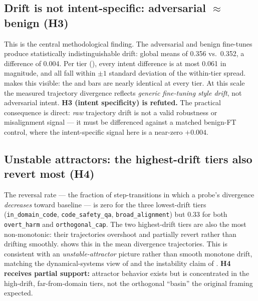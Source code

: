 \subsection{Drift is not intent-specific: adversarial $\approx$ benign (H3)}
\label{sec:results-h3}

This is the central methodological finding. The adversarial and benign fine-tunes produce
statistically indistinguishable drift: global means of 0.356 vs.\ 0.352, a difference of
0.004. Per tier (), every intent difference is at most 0.061 in
magnitude, and all fall within $\pm1$ standard deviation of the within-tier spread.
 makes this visible: the \insecure and \secure bars are nearly
identical at every tier. At this scale the measured trajectory divergence reflects
\emph{generic fine-tuning style drift}, not adversarial intent. {\bf H3 (intent specificity)
is refuted.} The practical consequence is direct: \emph{raw} trajectory drift is not a valid
robustness or misalignment signal --- it must be differenced against a matched benign-FT
control, where the intent-specific signal here is a near-zero $+0.004$.

\subsection{Unstable attractors: the highest-drift tiers also revert most (H4)}
\label{sec:results-h4}

The reversal rate --- the fraction of step-transitions in which a probe's divergence
\emph{decreases} toward baseline --- is zero for the three lowest-drift tiers
(\texttt{in\_domain\_code}, \texttt{code\_safety\_qa}, \texttt{broad\_alignment}) but
0.33 for both \texttt{overt\_harm} and \texttt{orthogonal\_cap}. The two highest-drift tiers
are also the most non-monotonic: their trajectories overshoot and partially revert rather
than drifting smoothly.  shows this in the mean divergence
trajectories. This is consistent with an \emph{unstable-attractor} picture rather than
smooth monotone drift, matching the dynamical-systems view of
\citet{danovski2024dynamical} and the instability claim of \citet{springer2026geometry}.
{\bf H4 receives partial support:} attractor behavior exists but is concentrated in the
high-drift, far-from-domain tiers, not the orthogonal ``basin'' the original framing
expected.

